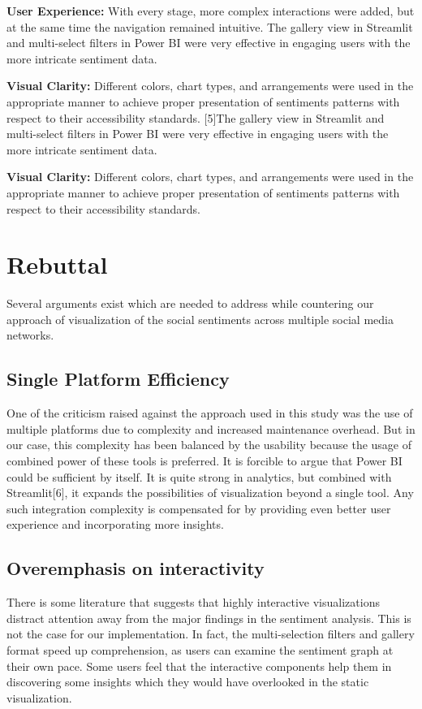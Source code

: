 \documentclass[conference]{IEEEtran}
\begin{document}
\textbf{User Experience:} With every stage, more complex interactions were added, but at the same time the navigation remained intuitive. The gallery view in Streamlit and multi-select filters in Power BI were very effective in engaging users with the more intricate sentiment data. 

\textbf{Visual Clarity:} Different colors, chart types, and arrangements were used in the appropriate manner to achieve proper presentation of sentiments patterns with respect to their accessibility standards. [5]The gallery view in Streamlit and multi-select filters in Power BI were very effective in engaging users with the more intricate sentiment data. 

\textbf{Visual Clarity:} Different colors, chart types, and arrangements were used in the appropriate manner to achieve proper presentation of sentiments patterns with respect to their accessibility standards.

\section{Rebuttal}

Several arguments exist which are needed to address while countering our approach of visualization of the social sentiments across multiple social media networks. 

\subsection{Single Platform Efficiency} 

One of the criticism raised against the approach used in this study was the use of multiple platforms due to complexity and increased maintenance overhead. But in our case, this complexity has been balanced by the usability because the usage of combined power of these tools is preferred. It is forcible to argue that Power BI could be sufficient by itself. It is quite strong in analytics, but combined with Streamlit[6], it expands the possibilities of visualization beyond a single tool. Any such integration complexity is compensated for by providing even better user experience and incorporating more insights.

\subsection{Overemphasis on interactivity} 

There is some literature that suggests that highly interactive visualizations distract attention away from the major findings in the sentiment analysis. This is not the case for our implementation. In fact, the multi-selection filters and gallery format speed up comprehension, as users can examine the sentiment graph at their own pace. Some users feel that the interactive components help them in discovering some insights which they would have overlooked in the static visualization.
\end{document}
